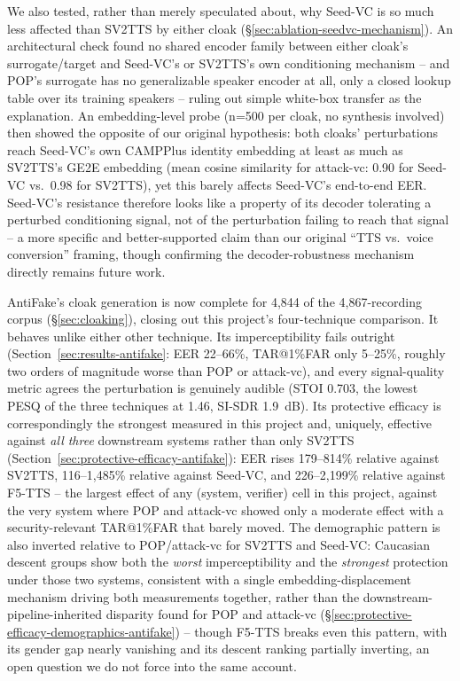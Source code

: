 \documentclass[11pt]{article}
\begin{document}
We also tested, rather than merely speculated about, why Seed-VC is so
much less affected than SV2TTS by either cloak
(\S\ref{sec:ablation-seedvc-mechanism}). An architectural check found
no shared encoder family between either cloak's surrogate/target and
Seed-VC's or SV2TTS's own conditioning mechanism -- and POP's surrogate
has no generalizable speaker encoder at all, only a closed lookup table
over its training speakers -- ruling out simple white-box transfer as
the explanation. An embedding-level probe (n=500 per cloak, no
synthesis involved) then showed the opposite of our original
hypothesis: both cloaks' perturbations reach Seed-VC's own CAMPPlus
identity embedding at least as much as SV2TTS's GE2E embedding (mean
cosine similarity for attack-vc: 0.90 for Seed-VC vs.\ 0.98 for
SV2TTS), yet this barely affects Seed-VC's end-to-end EER. Seed-VC's
resistance therefore looks like a property of its decoder tolerating a
perturbed conditioning signal, not of the perturbation failing to
reach that signal -- a more specific and better-supported claim than
our original ``TTS vs.\ voice conversion'' framing, though confirming
the decoder-robustness mechanism directly remains future work.

AntiFake's cloak generation is now complete for 4,844 of the
4,867-recording corpus (\S\ref{sec:cloaking}), closing out this
project's four-technique comparison. It behaves unlike either other
technique. Its imperceptibility fails outright
(Section~\ref{sec:results-antifake}: EER 22--66\%, TAR@1\%FAR only
5--25\%, roughly two orders of magnitude worse than POP or attack-vc),
and every signal-quality metric agrees the perturbation is genuinely
audible (STOI 0.703, the lowest PESQ of the three techniques at 1.46,
SI-SDR 1.9~dB). Its protective efficacy is correspondingly the
strongest measured in this project and, uniquely, effective against
\emph{all three} downstream systems rather than only SV2TTS
(Section~\ref{sec:protective-efficacy-antifake}): EER rises 179--814\%
relative against SV2TTS, 116--1{,}485\% relative against Seed-VC, and
226--2{,}199\% relative against F5-TTS -- the largest effect of any
(system, verifier) cell in this project, against the very system where
POP and attack-vc showed only a moderate effect with a
security-relevant TAR@1\%FAR that barely moved. The demographic pattern
is also inverted relative to POP/attack-vc for SV2TTS and Seed-VC:
Caucasian descent groups show both the \emph{worst} imperceptibility
and the \emph{strongest} protection under those two systems, consistent
with a single embedding-displacement mechanism driving both
measurements together, rather than the downstream-pipeline-inherited
disparity found for POP and attack-vc
(\S\ref{sec:protective-efficacy-demographics-antifake}) -- though
F5-TTS breaks even this pattern, with its gender gap nearly vanishing
and its descent ranking partially inverting, an open question we do not
force into the same account.
\end{document}
